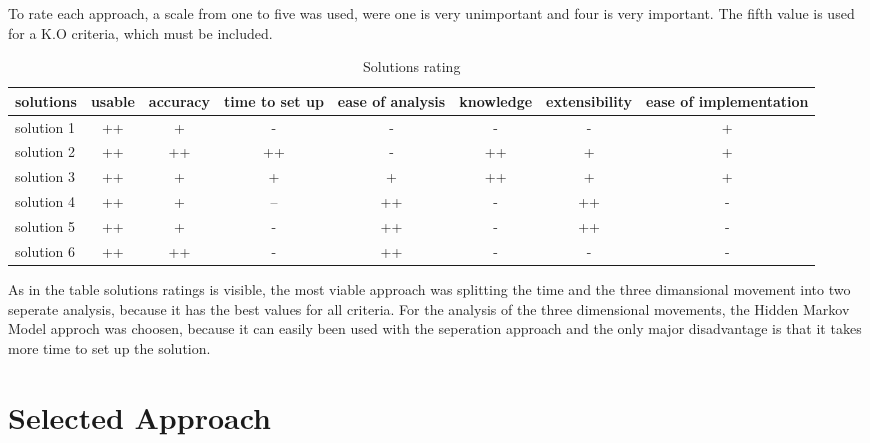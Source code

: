 To rate each approach, a scale from one to five was used, were one is very unimportant and four is very important. The fifth value is used for a K.O criteria, which must be included.

\begin{table}[h]
\begin{tabular}{|l|c|c|c|c|c|c|c|}
\hline
\textbf{solutions} & usable & accuracy & time to set up & ease of analysis & knowledge & extensibility & ease of implementation \\
\hline
solution 1 &\cellcolor[HTML]{38761d}++&\cellcolor[HTML]{93c47d}+&\cellcolor[HTML]{dd7e6b}-&\cellcolor[HTML]{dd7e6b}-&\cellcolor[HTML]{dd7e6b}-&\cellcolor[HTML]{dd7e6b}-&\cellcolor[HTML]{93c47d}+ \\
\hline
solution 2 &\cellcolor[HTML]{38761d}++&\cellcolor[HTML]{38761d}++&\cellcolor[HTML]{38761d}++&\cellcolor[HTML]{dd7e6b}-&\cellcolor[HTML]{38761d}++&\cellcolor[HTML]{93c47d}+&\cellcolor[HTML]{93c47d}+\\
\hline
solution 3 &\cellcolor[HTML]{38761d}++&\cellcolor[HTML]{93c47d}+&\cellcolor[HTML]{93c47d}+&\cellcolor[HTML]{93c47d}+&\cellcolor[HTML]{38761d}++&\cellcolor[HTML]{93c47d}+&\cellcolor[HTML]{93c47d}+\\
\hline
solution 4 &\cellcolor[HTML]{38761d}++&\cellcolor[HTML]{93c47d}+&\cellcolor[HTML]{cc4125}--&\cellcolor[HTML]{38761d}++&\cellcolor[HTML]{dd7e6b}-&\cellcolor[HTML]{38761d}++&\cellcolor[HTML]{dd7e6b}-\\
\hline
solution 5 &\cellcolor[HTML]{38761d}++&\cellcolor[HTML]{93c47d}+&\cellcolor[HTML]{dd7e6b}-&\cellcolor[HTML]{38761d}++&\cellcolor[HTML]{dd7e6b}-&\cellcolor[HTML]{38761d}++&\cellcolor[HTML]{dd7e6b}- \\
\hline
solution 6 &\cellcolor[HTML]{38761d}++&\cellcolor[HTML]{38761d}++&\cellcolor[HTML]{dd7e6b}-&\cellcolor[HTML]{38761d}++&\cellcolor[HTML]{dd7e6b}-&\cellcolor[HTML]{dd7e6b}-&\cellcolor[HTML]{dd7e6b}-\\
\hline
\end{tabular}
\caption{ Solutions rating }
\end{table}

As in the table solutions ratings is visible, the most viable approach was splitting the time and the three dimansional movement into two seperate analysis, because it has the best values for all criteria. For the analysis of the three dimensional movements, the Hidden Markov Model approch was choosen, because it can easily been used with the seperation approach and the only major disadvantage is that it takes more time to set up the solution. 

\section{Selected Approach}




